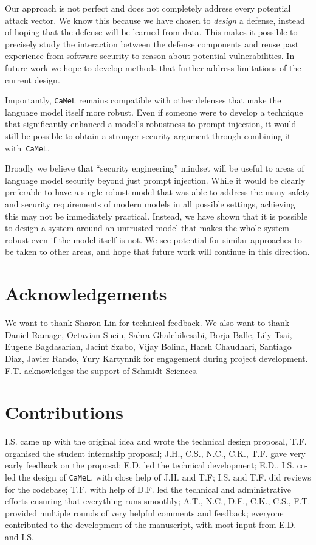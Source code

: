 \documentclass[11pt, a4paper, logo, copyright]{googledeepmind}
\newcommand{\sysname}{\texttt{CaMeL}\xspace}
\begin{document}
Our approach is not perfect and does not completely address every potential attack vector.
We know this because we have chosen to \emph{design} a defense, instead of hoping that the defense will be learned from data.
This makes it possible to precisely study the interaction between the defense components and reuse past experience from software security to reason about potential vulnerabilities.
In future work we hope to develop methods that further address limitations of the current design.

Importantly, \sysname{} remains compatible with other defenses that make the language model itself more robust.
Even if someone were to develop a technique that significantly enhanced a model's robustness to prompt injection, it would still be possible to obtain a stronger security argument through combining it with~\sysname{}.

Broadly we believe that ``security engineering'' mindset will be useful to areas of language model security beyond just prompt injection.
While it would be clearly preferable to have a single robust model that was able to address the many safety and security requirements of modern models in all possible settings, achieving this may not be immediately practical.
Instead, we have shown that it is possible to design a system around an untrusted model that makes the whole system robust even if the model itself is not.
We see potential for similar approaches to be taken to other areas, and hope that future work will continue in this direction.


\section*{Acknowledgements}
We want to thank Sharon Lin for technical feedback. We also want to thank Daniel Ramage, Octavian Suciu, Sahra Ghalebikesabi, Borja Balle, Lily Tsai, Eugene Bagdasarian, Jacint Szabo, Vijay Bolina, Harsh Chaudhari, Santiago Diaz, Javier Rando, Yury Kartynnik for engagement during project development. F.T. acknowledges the support of Schmidt Sciences.

\section*{Contributions}
I.S. came up with the original idea and wrote the technical design proposal, T.F. organised the student internship proposal; J.H., C.S., N.C., C.K., T.F. gave very early feedback on the proposal; E.D. led the technical development; E.D., I.S. co-led the design of \sysname{}, with close help of J.H. and T.F; I.S. and T.F. did reviews for the codebase; T.F. with help of D.F. led the technical and administrative efforts ensuring that everything runs smoothly; A.T., N.C., D.F., C.K., C.S., F.T. provided multiple rounds of very helpful comments and feedback; everyone contributed to the development of the manuscript, with most input from E.D. and I.S.
\end{document}
